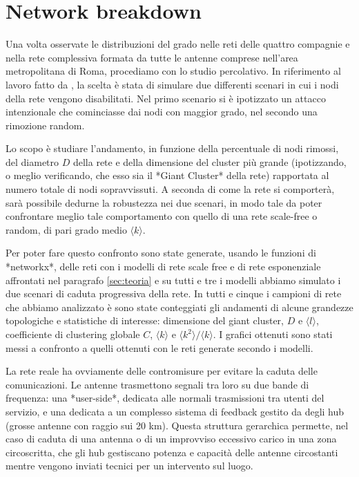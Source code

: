 
\section{Network breakdown}
\label{sec:attaack}

Una volta osservate le distribuzioni del grado nelle reti delle quattro compagnie e nella rete complessiva formata da tutte le antenne comprese nell'area metropolitana di Roma, procediamo con lo studio percolativo. In riferimento al lavoro fatto da \textcite{barbalbert2000}, la scelta è stata di simulare due differenti scenari in cui i nodi della rete vengono disabilitati. Nel primo scenario si è ipotizzato un attacco intenzionale che cominciasse dai nodi con maggior grado, nel secondo una rimozione random. 

Lo scopo è studiare l'andamento, in funzione della percentuale di nodi rimossi, del diametro $D$ della rete e della dimensione del cluster più grande (ipotizzando, o meglio verificando, che esso sia il *Giant Cluster* della rete) rapportata al numero totale di nodi sopravvissuti. A seconda di come la rete si comporterà, sarà possibile dedurne la robustezza nei due scenari, in modo tale da poter confrontare meglio tale comportamento con quello di una rete scale-free o random, di pari grado medio $\langle k \rangle$.

Per poter fare questo confronto sono state generate, usando le funzioni di *networkx*, delle reti con i modelli di rete scale free e di rete esponenziale affrontati nel paragrafo \ref{sec:teoria} e su tutti e tre i modelli abbiamo simulato i due scenari di caduta progressiva della rete. In tutti e cinque i campioni di rete che abbiamo analizzato è sono state conteggiati gli andamenti di alcune grandezze topologiche e statistiche di interesse: dimensione del giant cluster, $D$ e $\langle l \rangle$, coefficiente di clustering globale $C$, $\langle k \rangle$ e $\langle k^2 \rangle/\langle k \rangle$. I grafici ottenuti sono stati messi a confronto a quelli ottenuti con le reti generate secondo i modelli.

La rete reale ha ovviamente delle contromisure per evitare la caduta delle comunicazioni. Le antenne trasmettono segnali tra loro su due bande di frequenza: una *user-side*, dedicata alle normali trasmissioni tra utenti del servizio, e una dedicata a un complesso sistema di feedback gestito da degli hub (grosse antenne con raggio sui 20 km). Questa struttura gerarchica permette, nel caso di caduta di una antenna o di un improvviso eccessivo carico in una zona circoscritta, che gli hub gestiscano potenza e capacità delle antenne circostanti mentre vengono inviati tecnici per un intervento sul luogo.

